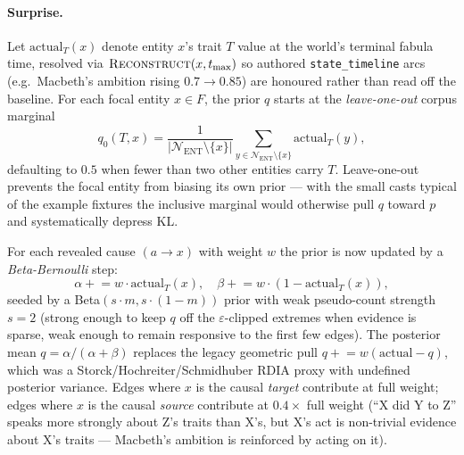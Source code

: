 \documentclass[11pt]{article}
\begin{document}
\paragraph{Surprise.} Let $\mathrm{actual}_T(x)$ denote entity
$x$'s trait $T$ value at the world's terminal fabula time,
resolved via $\textsc{Reconstruct}(x, t_{\max})$ so authored
\texttt{state\_timeline} arcs (e.g.\ Macbeth's ambition rising
$0.7 \to 0.85$) are honoured rather than read off the baseline.
For each focal entity $x \in F$, the prior $q$ starts at the
\emph{leave-one-out} corpus marginal
\begin{equation}
\label{eq:loo-marginal}
q_0(T, x) = \frac{1}{|\mathcal{N}_{\mathrm{ENT}} \setminus \{x\}|}
\!\!\sum_{y \in \mathcal{N}_{\mathrm{ENT}} \setminus \{x\}}\!\! \mathrm{actual}_T(y),
\end{equation}
defaulting to $0.5$ when fewer than two other entities carry $T$.
Leave-one-out prevents the focal entity from biasing its own
prior --- with the small casts typical of the example fixtures the
inclusive marginal would otherwise pull $q$ toward $p$ and
systematically depress KL.

For each revealed cause $(a \to x)$ with weight $w$ the prior
is now updated by a \emph{Beta-Bernoulli} step:
\begin{equation}
\label{eq:surprise}
\alpha \mathrel{+}= w \cdot \mathrm{actual}_T(x), \quad
\beta \mathrel{+}= w \cdot (1 - \mathrm{actual}_T(x)),
\end{equation}
seeded by a Beta$(s \cdot m, s \cdot (1-m))$ prior with weak
pseudo-count strength $s = 2$ (strong enough to keep $q$ off the
$\varepsilon$-clipped extremes when evidence is sparse, weak
enough to remain responsive to the first few edges). The
posterior mean $q = \alpha / (\alpha + \beta)$ replaces the
legacy geometric pull $q \mathrel{+}= w(\mathrm{actual} - q)$,
which was a Storck/Hochreiter/Schmidhuber RDIA proxy with
undefined posterior variance. Edges where $x$ is the causal
\emph{target} contribute at full weight; edges where $x$ is the
causal \emph{source} contribute at $0.4 \times$ full weight (``X
did Y to Z'' speaks more strongly about Z's traits than X's,
but X's act is non-trivial evidence about X's traits ---
Macbeth's ambition is reinforced by acting on it).
\end{document}
